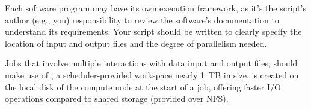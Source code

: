 \noindent Each software program may have its own execution framework, as it's the script's author (e.g., you)
responsibility to review the software's documentation to understand its requirements.
Your script should be written to clearly specify the location of input and output files and the degree of parallelism needed.

\noindent Jobs that involve multiple interactions with data input and output files, should make use of ,
a scheduler-provided workspace nearly 1~TB in size.
 is created on the local disk of the compute node at the start of a job, offering faster I/O operations
compared to shared storage (provided over NFS).


